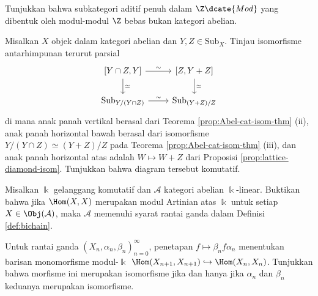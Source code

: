 \vfill
\begin{Exercises}
	\item Tunjukkan bahwa subkategori aditif penuh dalam $\Z\dcate{Mod}$ yang
	dibentuk oleh modul-modul $\Z$ bebas bukan kategori abelian.

	\item Misalkan $X$ objek dalam kategori abelian dan
	$Y,Z\in\mathrm{Sub}_X$. Tinjau isomorfisme antarhimpunan terurut parsial
	\[\begin{tikzcd}
		\left[Y \cap Z, Y \right] \arrow[d, "\simeq"] \arrow[r, "\sim"] & \left[ Z, Y+Z \right] \arrow[d, "\simeq"] \\
		\mathrm{Sub}_{Y/(Y \cap Z)} \arrow[r, "\sim"] & \mathrm{Sub}_{(Y+Z)/Z}
	\end{tikzcd}\]
	di mana anak panah vertikal berasal dari Teorema
	\ref{prop:Abel-cat-isom-thm} (ii), anak panah horizontal bawah berasal dari
	isomorfisme $Y/(Y\cap Z)\simeq(Y+Z)/Z$ pada Teorema
	\ref{prop:Abel-cat-isom-thm} (iii), dan anak panah horizontal atas adalah
	$W\mapsto W+Z$ dari Proposisi \ref{prop:lattice-diamond-isom}. Tunjukkan
	bahwa diagram tersebut komutatif.

	\item Misalkan $\Bbbk$ gelanggang komutatif dan $\mathcal{A}$ kategori
	abelian $\Bbbk$-linear. Buktikan bahwa jika $\Hom(X,X)$ merupakan modul
	Artinian atas $\Bbbk$ untuk setiap $X\in\Obj(\mathcal{A})$, maka
	$\mathcal{A}$ memenuhi syarat rantai ganda dalam Definisi
	\ref{def:bichain}.
	\begin{hint}
		Untuk rantai ganda $(X_n,\alpha_n,\beta_n)_{n=0}^\infty$, penetapan
		$f\mapsto\beta_n f\alpha_n$ menentukan barisan monomorfisme
		modul-$\Bbbk$
		$\Hom(X_{n+1},X_{n+1})\hookrightarrow\Hom(X_n,X_n)$. Tunjukkan bahwa
		morfisme ini merupakan isomorfisme jika dan hanya jika $\alpha_n$ dan
		$\beta_n$ keduanya merupakan isomorfisme.
	\end{hint}


\end{Exercises}
